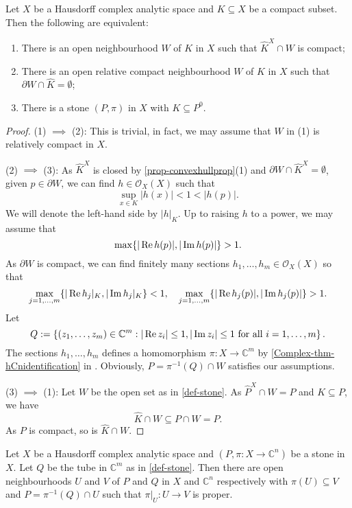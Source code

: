 \begin{thm}\label{thm-fixedcptsethullloccpt}
    Let $X$ be a Hausdorff complex analytic space and $K\subseteq X$ be a compact subset. Then the following are equivalent:
    \begin{enumerate}
        \item There is an open neighbourhood $W$ of $K$ in $X$ such that $\hat{K}^X\cap W$ is compact;
        \item There is an open relative compact neighbourhood $W$ of $K$ in $X$ such that $\partial W\cap \hat{K}=\emptyset$;
        \item There is a stone $(P,\pi)$ in $X$ with $K\subseteq P^0$.
    \end{enumerate}
\end{thm}
\begin{proof}
    (1) $\implies$ (2): This is trivial, in fact, we may assume that $W$ in (1) is relatively compact in $X$.

    (2) $\implies$ (3): As $\hat{K}^X$ is closed by \cref{prop-convexhullprop}(1) and $\partial W\cap \hat{K}^X=\emptyset$, given $p\in \partial W$, we can find $h\in \mathcal{O}_X(X)$ such that
    \[
        \sup_{x\in K}|h(x)|<1<|h(p)|.
    \]
    We will denote the left-hand side by $|h|_K$.
    Up to raising $h$ to a power, we may assume that 
    \[
        \max\{|\operatorname{Re} h(p)|,|\operatorname{Im} h(p)| \}>1. 
    \]
    As $\partial W$ is compact, we can find finitely many sections $h_1,\ldots,h_m\in \mathcal{O}_X(X)$ so that
    \[
        \max_{j=1,\ldots,m} \{|\operatorname{Re} h_j|_K,|\operatorname{Im} h_j|_K\}<1,\quad \max_{j=1,\ldots,m} \{|\operatorname{Re} h_j(p)|,|\operatorname{Im} h_j(p)|\}>1.  
    \]
    Let 
    \[
        Q:=\left\{ (z_1,\ldots,z_m)\in \mathbb{C}^m: |\operatorname{Re} z_i|\leq 1, |\operatorname{Im} z_i|\leq 1\text{ for all }i=1,\ldots,m \right\}.  
    \]
    The sections $h_1,\ldots,h_m$ defines a homomorphism $\pi:X\rightarrow \mathbb{C}^m$ by \cref{Complex-thm-hCnidentification} in . Obviously, $P=\pi^{-1}(Q)\cap W$ satisfies our assumptions.

    (3) $\implies$ (1): Let $W$ be the open set as in \cref{def-stone}. As $\hat{P}^X\cap W=P$ and $K\subseteq P$, we have
    \[
        \hat{K}\cap W\subseteq P\cap W=P.  
    \]
    As $P$ is compact, so is $\hat{K}\cap W$.
\end{proof}

\begin{thm}\label{thm-stonelocallyproper}
    Let $X$ be a Hausdorff complex analytic space and $(P,\pi:X\rightarrow \mathbb{C}^n)$ be a stone in $X$. Let $Q$ be the tube in $\mathbb{C}^m$ as in \cref{def-stone}. Then there are open neighbourhoods $U$ and $V$ of $P$ and $Q$ in $X$ and $\mathbb{C}^n$ respectively with $\pi(U)\subseteq V$ and $P=\pi^{-1}(Q)\cap U$ such that $\pi|_U:U\rightarrow V$ is proper.
\end{thm}

